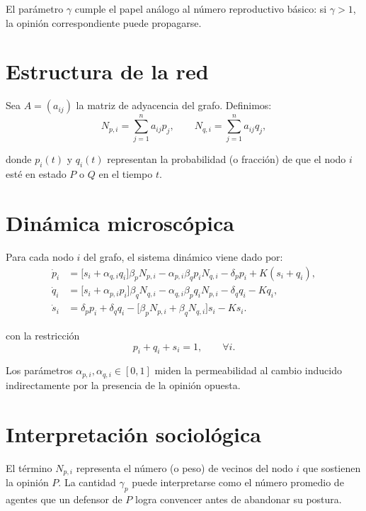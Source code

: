 \documentclass[11pt,a4paper]{article}
\begin{document}
El parámetro $\gamma$ cumple el papel análogo al número reproductivo básico: si $\gamma > 1$, la opinión correspondiente puede propagarse.

\section{Estructura de la red}

Sea $A = (a_{ij})$ la matriz de adyacencia del grafo. Definimos:
\begin{equation}
    N_{p,i} = \sum_{j=1}^n a_{ij} p_j, \qquad N_{q,i} = \sum_{j=1}^n a_{ij} q_j,
\end{equation}

donde $p_i(t)$ y $q_i(t)$ representan la probabilidad (o fracción) de que el nodo $i$ esté en estado $P$ o $Q$ en el tiempo $t$.

\section{Dinámica microscópica}

Para cada nodo $i$ del grafo, el sistema dinámico viene dado por:
\begin{align}
    \dot p_i &= \bigl[s_i + \alpha_{q,i}q_i\bigr] \beta_p  N_{p,i}
    - \alpha_{p,i}\beta_q p_i N_{q,i} - \delta_p p_i+K(s_i+q_i),  \\
    \dot q_i &= \bigl[ s_i + \alpha_{p,i} p_i\bigr] \beta_q N_{q,i}
    - \alpha_{q,i}\beta_p q_i N_{p,i} - \delta_q q_i-Kq_i, \\
    \dot s_i &= \delta_p p_i + \delta_q q_i - \bigl[\beta_p N_{p,i} + \beta_q N_{q,i}\bigr] s_i-Ks_i.
\end{align}

con la restricción
\begin{equation}
    p_i + q_i + s_i = 1, \qquad \forall i.
\end{equation}

Los parámetros $\alpha_{p,i}, \alpha_{q,i}\in [0,1]$ miden la permeabilidad al cambio inducido indirectamente por la presencia de la opinión opuesta.

\section{Interpretación sociológica}

El término $N_{p,i}$ representa el número (o peso) de vecinos del nodo $i$ que sostienen la opinión $P$. La cantidad $\gamma_p$ puede interpretarse como el número promedio de agentes que un defensor de $P$ logra convencer antes de abandonar su postura.
\end{document}
